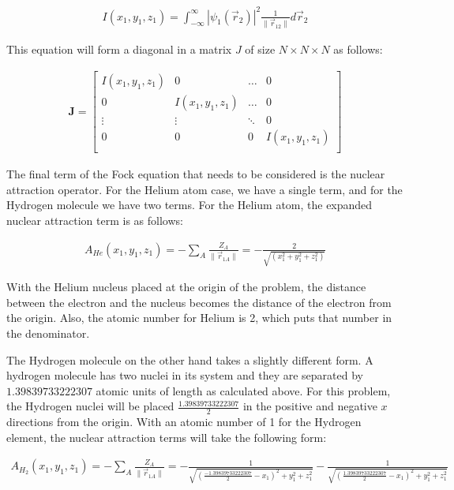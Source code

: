 \documentclass[10pt, oneside, letterpaper]{article}
\begin{document}
\begin{align*}
  I(x_1, y_1, z_1) = \int_{-\infty}^{\infty}\left|\psi_1(\vec{r}_2)\right|^2\frac{1}{\|\vec{r}_{12}\|}d\vec{r}_2
\end{align*}

This equation will form a diagonal in a matrix $J$ of size $N \times N \times N$ as follows:

\begin{align*}
\bm{J} =
\begin{bmatrix}
 I(x_1, y_1, z_1) & 0 & \hdots & 0\\
 0 &  I(x_1, y_1, z_1) & \hdots & 0\\
 \vdots & \vdots & \ddots & 0\\
 0 & 0 & 0 &  I(x_1, y_1, z_1)\\
\end{bmatrix}
\end{align*}

The final term of the Fock equation that needs to be considered is the nuclear attraction operator. For the Helium atom case, we have a single term, and for the Hydrogen molecule we have two terms. For the Helium atom, the expanded nuclear attraction term is as follows:

\begin{align*}
  A_{He}(x_1, y_1, z_1) = -\sum_A\frac{Z_A}{\|\vec{r}_{1 A}\|} = -\frac{2}{\sqrt{(x_1^2 + y_1^2 + z_1^2)}}
\end{align*}

With the Helium nucleus placed at the origin of the problem, the distance between the electron and the nucleus becomes the distance of the electron from the origin. Also, the atomic number for Helium is 2, which puts that number in the denominator.

The Hydrogen molecule on the other hand takes a slightly different form. A hydrogen molecule has two nuclei in its system and they are separated by $1.39839733222307$ atomic units of length as calculated above. For this problem, the Hydrogen nuclei will be placed $\frac{1.39839733222307}{2}$ in the positive and negative $x$ directions from the origin. With an atomic number of 1 for the Hydrogen element, the nuclear attraction terms will take the following form:

\begin{align*}
  A_{H_2}(x_1, y_1, z_1) = -\sum_A\frac{Z_A}{\|\vec{r}_{1 A}\|} = -\frac{1}{\sqrt{(\frac{-1.39839733222307}{2}-x_1)^2 + y_1^2 + z_1^2}} -\frac{1}{\sqrt{(\frac{1.39839733222307}{2}-x_1)^2 + y_1^2 + z_1^2}}
\end{align*}
\end{document}
